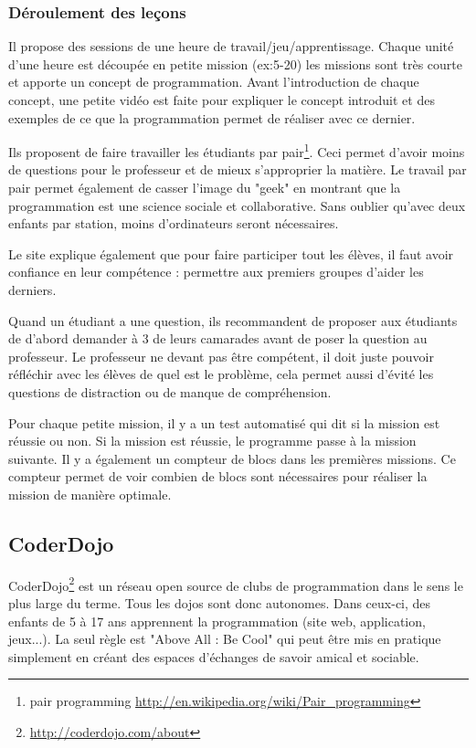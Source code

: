 \subsubsection{Déroulement des leçons}
Il propose des sessions de une heure de travail/jeu/apprentissage. Chaque unité d'une heure est découpée en petite mission (ex:5-20) les missions sont très courte et apporte un concept de programmation. Avant l'introduction de chaque concept, une petite vidéo est faite pour expliquer le concept introduit et des exemples de ce que la programmation permet de réaliser avec ce dernier.

Ils proposent de faire travailler les étudiants par pair\footnote{pair programming \url{http://en.wikipedia.org/wiki/Pair\_programming}}. Ceci permet d'avoir moins de questions pour le professeur et de mieux s'approprier la matière. Le travail par pair permet également de casser l'image du "geek" en montrant que la programmation est une science sociale et collaborative. Sans oublier qu'avec deux enfants par station, moins d'ordinateurs seront nécessaires.

Le site explique également que pour faire participer tout les élèves, il faut avoir confiance en leur compétence : permettre aux premiers groupes d'aider les derniers.

Quand un étudiant a une question, ils recommandent de proposer aux étudiants de d'abord demander à 3 de leurs camarades avant de poser la question au professeur. Le professeur ne devant pas être compétent, il doit juste pouvoir réfléchir avec les élèves de quel est le problème, cela permet aussi d'évité les questions de distraction ou de manque de compréhension.

Pour chaque petite mission, il y a un test automatisé qui dit si la mission est réussie ou non. Si la mission est réussie, le programme passe à la mission suivante. Il y a également un compteur de blocs dans les premières missions. Ce compteur permet de voir combien de blocs sont nécessaires pour réaliser la mission de manière optimale.

\subsection{CoderDojo}
CoderDojo\footnote{\url{http://coderdojo.com/about}} est un réseau open source de clubs de programmation dans le sens le plus large du terme. Tous les dojos sont donc autonomes. Dans ceux-ci, des enfants de 5 à 17 ans apprennent la programmation (site web, application, jeux...). La seul règle est "Above All : Be Cool" qui peut être mis en pratique simplement en créant des espaces d'échanges de savoir amical et sociable.

